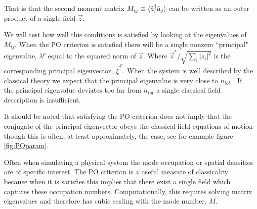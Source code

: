 \documentclass[aps,prd,twocolumn,superscriptaddress]{revtex4-1}
\begin{document}
That is that the second moment matrix $M_{ij} \equiv \braket{\hat a^\dagger_i \hat a_j}$ can be written as an outer product of a single field $\vec z$. 

We will test how well this conditions is satisfied by looking at the eigenvalues of $M_{ij}$. When the PO criterion is satisfied there will be a single nonzero ``principal" eigenvalue, $\lambda^p$ equal to the squared norm of $\vec z$. Where $\vec z^* / \sqrt{\sum_i|z_i|^2}$ is the corresponding principal eigenvector, $\vec \xi^p$.  When the system is well described by the classical theory we expect that the principal eigenvalue is very close to $n_{tot}$ \cite{Leggett2001}. If the principal eigenvalue deviates too far from $n_{tot}$ a single classical field description is insufficient.

It should be noted that satisfying the PO criterion does not imply that the conjugate of the principal eigenvector obeys the classical field equations of motion though this is often, at least approximately, the case, see for example figure \ref{fig:POparam}.

Often when simulating a physical system the mode occupation or spatial densities are of specific interest. The PO criterion is a useful measure of classicality because when it is satisfies this implies that there exist a single field which captures these occupation numbers. Computationally, this requires solving matrix eigenvalues and therefore has cubic scaling with the mode number, $M$.
\end{document}
